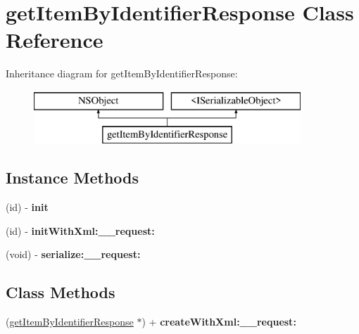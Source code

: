 \hypertarget{interfaceget_item_by_identifier_response}{}\section{get\+Item\+By\+Identifier\+Response Class Reference}
\label{interfaceget_item_by_identifier_response}
Inheritance diagram for get\+Item\+By\+Identifier\+Response\+:\begin{figure}[H]
\begin{center}
\leavevmode
\includegraphics[height=2.000000cm]{interfaceget_item_by_identifier_response}
\end{center}
\end{figure}
\subsection*{Instance Methods}
\begin{DoxyCompactItemize}
\item 
\hypertarget{interfaceget_item_by_identifier_response_a46b120a12416ac8eaf6f4f160c27cfba}{}(id) -\/ {\bfseries init}\label{interfaceget_item_by_identifier_response_a46b120a12416ac8eaf6f4f160c27cfba}

\item 
\hypertarget{interfaceget_item_by_identifier_response_add26261fdc17dc1f3970de6b118c088c}{}(id) -\/ {\bfseries init\+With\+Xml\+:\+\_\+\+\_\+request\+:}\label{interfaceget_item_by_identifier_response_add26261fdc17dc1f3970de6b118c088c}

\item 
\hypertarget{interfaceget_item_by_identifier_response_aa312081b0b9f097f50eae5ae0dbdb3a9}{}(void) -\/ {\bfseries serialize\+:\+\_\+\+\_\+request\+:}\label{interfaceget_item_by_identifier_response_aa312081b0b9f097f50eae5ae0dbdb3a9}

\end{DoxyCompactItemize}
\subsection*{Class Methods}
\begin{DoxyCompactItemize}
\item 
\hypertarget{interfaceget_item_by_identifier_response_a3953e9c8c84b1707095aa7cd3a912f6d}{}(\hyperlink{interfaceget_item_by_identifier_response}{get\+Item\+By\+Identifier\+Response} $\ast$) + {\bfseries create\+With\+Xml\+:\+\_\+\+\_\+request\+:}\label{interfaceget_item_by_identifier_response_a3953e9c8c84b1707095aa7cd3a912f6d}

\end{DoxyCompactItemize}
